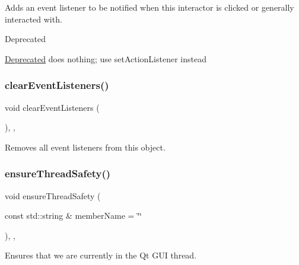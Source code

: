 Adds an event listener to be notified when this interactor is clicked or generally interacted with. 

\begin{DoxyRefDesc}{Deprecated}
\item[\mbox{\hyperlink{deprecated__deprecated000006}{Deprecated}}]does nothing; use set\+Action\+Listener instead \end{DoxyRefDesc}
\mbox{\label{classGObservable_a80cfa040459ff53594adbd6a51ec8f43}} 
\subsubsection{\texorpdfstring{clear\+Event\+Listeners()}{clearEventListeners()}}
{\footnotesize\ttfamily void clear\+Event\+Listeners (\begin{DoxyParamCaption}{ }\end{DoxyParamCaption})\hspace{0.3cm}{\ttfamily [protected]}, {\ttfamily [virtual]}, {\ttfamily [inherited]}}



Removes all event listeners from this object. 

\mbox{\label{classGObservable_a284f31528c0520f8e545c03ac9eeac74}} 
\subsubsection{\texorpdfstring{ensure\+Thread\+Safety()}{ensureThreadSafety()}}
{\footnotesize\ttfamily void ensure\+Thread\+Safety (\begin{DoxyParamCaption}\item[{const std\+::string \&}]{member\+Name = {\ttfamily \char`\"{}\char`\"{}} }\end{DoxyParamCaption})\hspace{0.3cm}{\ttfamily [protected]}, {\ttfamily [virtual]}, {\ttfamily [inherited]}}



Ensures that we are currently in the Qt G\+UI thread. 

\mbox{\label{classGInteractor_a597a370b592e3737d38d9d2f4e2031ea}} 
